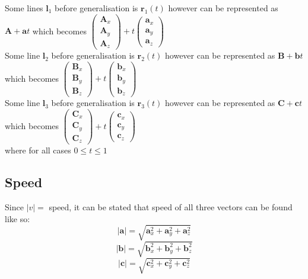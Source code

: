 \documentclass{article}
\begin{document}
													Some lines \(\mathbf{l}_1\) before generalisation is \(\mathbf{r}_{1}(t)\) however can be represented as \(\mathbf{A} + \mathbf{a}t\) which becomes \(\begin{pmatrix} \mathbf{A}_x \\ \mathbf{A}_y \\ \mathbf{A}_z \end{pmatrix} + t \begin{pmatrix} \mathbf{a}_x \\ \mathbf{a}_y \\ \mathbf{a}_z \end{pmatrix}\) \\
													Some line \(\mathbf{l}_2\) before generalisation is \(\mathbf{r}_{2}(t)\) however can be represented as \(\mathbf{B} + \mathbf{b}t\) which becomes \(\begin{pmatrix} \mathbf{B}_x \\ \mathbf{B}_y \\ \mathbf{B}_z \end{pmatrix} + t \begin{pmatrix} \mathbf{b}_x \\ \mathbf{b}_y \\ \mathbf{b}_z \end{pmatrix}\) \\
													Some line \(\mathbf{l}_3\) before generalisation is \(\mathbf{r}_{3}(t)\) however can be represented as \(\mathbf{C} + \mathbf{c}t\) which becomes \(\begin{pmatrix} \mathbf{C}_x \\ \mathbf{C}_y \\ \mathbf{C}_z \end{pmatrix} + t \begin{pmatrix} \mathbf{c}_x \\ \mathbf{c}_y \\ \mathbf{c}_z \end{pmatrix}\) \\
													where for all cases \(0 \le t \le 1\)
													\subsection*{Speed}
													Since \(|v| = \) speed, it can be stated that speed of all three vectors can be found like so:
													\[|\mathbf{a}| = \sqrt{\mathbf{a}^{2}_x + \mathbf{a}^{2}_y + \mathbf{a}^{2}_z}\]
													\[|\mathbf{b}| = \sqrt{\mathbf{b}^{2}_x + \mathbf{b}^{2}_y + \mathbf{b}^{2}_z}\]
													\[|\mathbf{c}| = \sqrt{\mathbf{c}^{2}_x + \mathbf{c}^{2}_y + \mathbf{c}^{2}_z}\]
\end{document}
